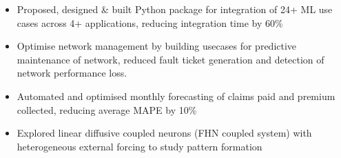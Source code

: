 \documentclass[10pt,a4paper,ragged2e,withhyper]{altacv}
\begin{document}
\begin{paracol}{2}
\par\divider
{}
\begin{itemize}
\item Proposed, designed \& built Python package for integration of 24+ ML use cases across 4+ applications, reducing integration time by 60\%
\item Optimise network management by building usecases for predictive maintenance of network, reduced fault ticket generation and detection of network performance loss.
\end{itemize}


\par\divider
{}
\begin{itemize}
\item Automated and optimised monthly forecasting of claims paid and premium collected, reducing average MAPE by 10\%
\end{itemize}


\par\divider


\begin{itemize}
\item Explored linear diffusive coupled neurons (FHN coupled system) with heterogeneous external forcing to study pattern formation
\end{itemize}



\end{paracol}
\end{document}
